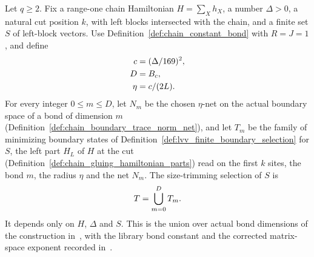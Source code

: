 \begin{definition}
    \label{def:lvv_size_trimming_selection}
    \leanok
    Let $q\ge2$. Fix a range-one chain Hamiltonian $H=\sum_Xh_X$, a number
    $\Delta>0$, a natural cut position $k$, with left blocks intersected with
    the chain, and a finite set $S$ of left-block vectors. Use
    Definition~\ref{def:chain_constant_bond} with $R=J=1$, and define
    \begin{align}
        c    & =(\Delta/169)^2,\notag \\
        D    & =B_c,\notag            \\
        \eta & =c/(2L).\notag
    \end{align}
    For every integer $0\le m\le D$, let $N_m$ be the chosen $\eta$-net on the
    actual boundary space of a bond of dimension $m$
    (Definition~\ref{def:chain_boundary_trace_norm_net}), and let $T_m$ be the
    family of minimizing boundary states of
    Definition~\ref{def:lvv_finite_boundary_selection} for $S$, the left part
    $H_L$ of $H$ at the cut (Definition~\ref{def:chain_gluing_hamiltonian_parts})
    read on the first $k$ sites, the bond $m$, the radius $\eta$ and the net $N_m$.
    The size-trimming selection of $S$ is
    \begin{align}
        T=\bigcup_{m=0}^{D}T_m.\notag
    \end{align}
    It depends only on $H$, $\Delta$ and $S$. This is the union over actual
    bond dimensions of the construction
    in~\cite[Claim~2.7, source lines 472--478 and 520--527]{Landau2015Polynomial},
    with the library bond constant and the corrected matrix-space exponent
    recorded in~\cite{gap:lvv13_constant_bond,gap:lvv13_trace_norm_net}.
\end{definition}

